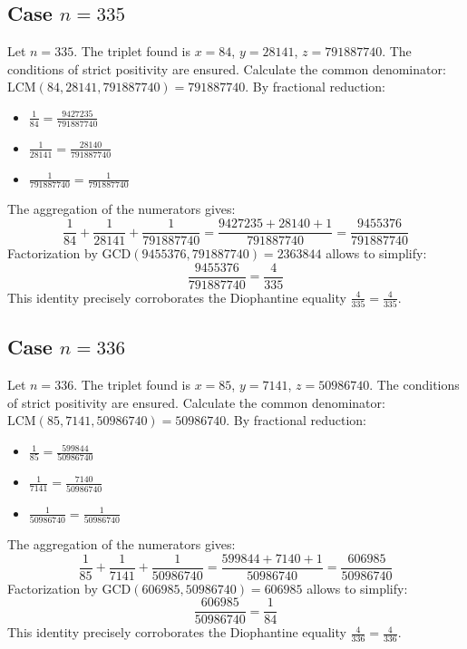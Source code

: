 \documentclass[11pt,a4paper]{article}
\begin{document}
\subsection{Case $n = 335$}
Let $n = 335$. The triplet found is $x = 84$, $y = 28141$, $z = 791887740$.
The conditions of strict positivity are ensured.
Calculate the common denominator: $\text{LCM}(84, 28141, 791887740) = 791887740$.
By fractional reduction:
\begin{itemize}
    \item $\frac{1}{84} = \frac{9427235}{791887740}$
    \item $\frac{1}{28141} = \frac{28140}{791887740}$
    \item $\frac{1}{791887740} = \frac{1}{791887740}$
\end{itemize}
The aggregation of the numerators gives:
$$ \frac{1}{84} + \frac{1}{28141} + \frac{1}{791887740} = \frac{9427235 + 28140 + 1}{791887740} = \frac{9455376}{791887740} $$
Factorization by $\text{GCD}(9455376, 791887740) = 2363844$ allows to simplify:
$$ \frac{9455376}{791887740} = \frac{4}{335} $$
This identity precisely corroborates the Diophantine equality $\frac{4}{335} = \frac{4}{335}$.

\subsection{Case $n = 336$}
Let $n = 336$. The triplet found is $x = 85$, $y = 7141$, $z = 50986740$.
The conditions of strict positivity are ensured.
Calculate the common denominator: $\text{LCM}(85, 7141, 50986740) = 50986740$.
By fractional reduction:
\begin{itemize}
    \item $\frac{1}{85} = \frac{599844}{50986740}$
    \item $\frac{1}{7141} = \frac{7140}{50986740}$
    \item $\frac{1}{50986740} = \frac{1}{50986740}$
\end{itemize}
The aggregation of the numerators gives:
$$ \frac{1}{85} + \frac{1}{7141} + \frac{1}{50986740} = \frac{599844 + 7140 + 1}{50986740} = \frac{606985}{50986740} $$
Factorization by $\text{GCD}(606985, 50986740) = 606985$ allows to simplify:
$$ \frac{606985}{50986740} = \frac{1}{84} $$
This identity precisely corroborates the Diophantine equality $\frac{4}{336} = \frac{4}{336}$.
\end{document}
